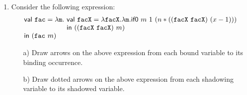 \begin{enumerate}
\begin{itemize}
\end{itemize}

\item Consider the following expression:
\[
\begin{array}{l@{~}l}
\textsf{val}\ \code{fac} = \lambda \code{m}. &
\textsf{val}\ \code{facX} = \lambda \code{facX}.
\lambda \code{m}. \textsf{if0}\ m\ 1\ (n * ((\code{facX}\ \code{facX})\ (x - 1)))\\
&\textsf{in}\ ((\code{facX}\ \code{facX})\ m)\\
\textsf{in}\ (\code{fac}\ m)
\end{array}
\]

\begin{itemize}
\item[a)] Draw arrows on the above expression from each bound variable to its binding occurrence.
\item[b)] Draw dotted arrows on the above expression from each shadowing variable to its shadowed variable.
\end{itemize}


\end{enumerate}
